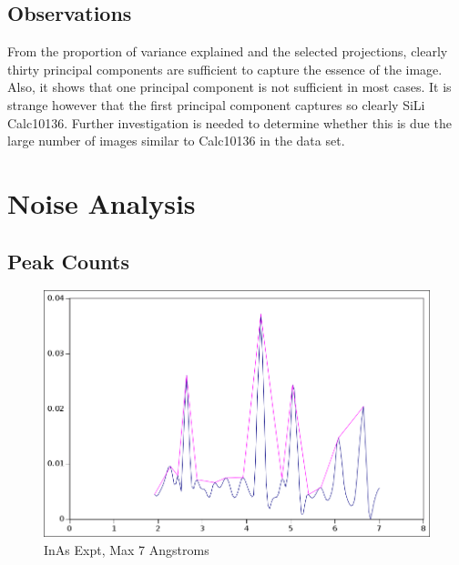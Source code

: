 \documentclass[12pt,letterpaper]{article}
\begin{document}
\subsection{Observations}
From the proportion of variance explained and the selected projections, clearly
thirty principal components are sufficient to capture the essence of the image.
Also, it shows that one principal component is not sufficient in most cases. It
is strange however that the first principal component captures so clearly
SiLi Calc10136. Further investigation is needed to determine whether this is due
the large number of images similar to Calc10136 in the data set.

\section{Noise Analysis}
\subsection{Peak Counts}
\begin{figure}[ht]
  \begin{center}
    \includegraphics[scale=0.5]{figs/inas_peaks_7ang.png}
    \caption{InAs Expt, Max 7 Angstroms}
  \end{center}
\end{figure}
\end{document}
